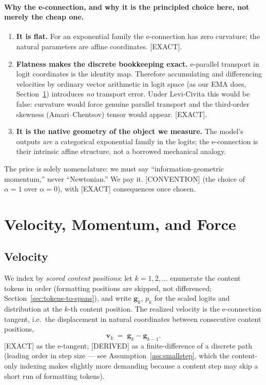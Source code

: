 \documentclass[11pt]{article}
\begin{document}
\paragraph{Why the e-connection, and why it is the principled choice here, not merely the cheap one.}
\begin{enumerate}[leftmargin=1.7em]
  \item \textbf{It is flat.} For an exponential family the e-connection has zero curvature; the natural parameters are affine coordinates. \textsf{[EXACT]}.
  \item \textbf{Flatness makes the discrete bookkeeping exact.} e-parallel transport in logit coordinates is the identity map. Therefore accumulating and differencing velocities by ordinary vector arithmetic in logit space (as our EMA does, Section~\ref{sec:inertial}) introduces \emph{no} transport error. Under Levi-Civita this would be false: curvature would force genuine parallel transport and the third-order skewness (Amari--Chentsov) tensor would appear. \textsf{[EXACT]}.
  \item \textbf{It is the native geometry of the object we measure.} The model's outputs \emph{are} a categorical exponential family in the logits; the e-connection is their intrinsic affine structure, not a borrowed mechanical analogy.
\end{enumerate}
The price is solely nomenclature: we must say ``information-geometric momentum,'' never ``Newtonian.'' We pay it. \textsf{[CONVENTION]} (the choice of $\alpha=1$ over $\alpha=0$), with \textsf{[EXACT]} consequences once chosen.

\section{Velocity, Momentum, and Force}
\label{sec:inertial}

\subsection{Velocity}
We index by \emph{scored content positions}: let $k=1,2,\dots$ enumerate the content tokens in order (formatting positions are skipped, not differenced; Section~\ref{sec:tokens-to-spans}), and write $\bm{g}_k$, $p_k$ for the scaled logits and distribution at the $k$-th content position. The realized velocity is the e-connection tangent, i.e.\ the displacement in natural coordinates between consecutive content positions,
\begin{equation}
  \bm{v}_k \;=\; \bm{g}_k - \bm{g}_{k-1}.
\end{equation}
\textsf{[EXACT]} as the e-tangent; \textsf{[DERIVED]} as a finite-difference of a discrete path (leading order in step size --- see Assumption~\ref{ass:smallstep}, which the content-only indexing makes slightly more demanding because a content step may skip a short run of formatting tokens).
\end{document}
